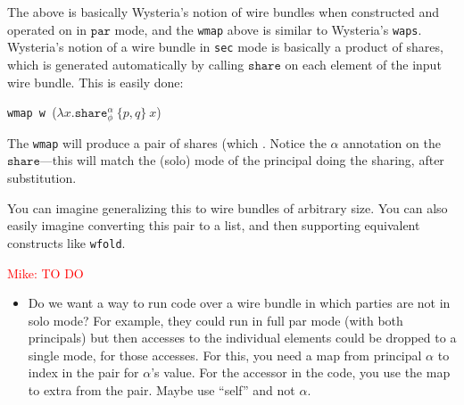 \documentclass[10pt]{article}
\newcommand{\kw}[1]{\ensuremath{\mathtt{#1}}}
\newcommand{\eshare}[4]{\ensuremath{\kw{share}^{#2}_{#1}~{#3}~{#4}}}
\newcommand{\elam}[2]{\ensuremath{\lambda {#1}.{#2}}}
\newcommand{\mwh}[1]{\textcolor{red}{Mike: #1}}
\begin{document}
The above is basically Wysteria's notion of wire bundles when
constructed and operated on in $\kw{par}$ mode, and the \texttt{wmap}
above is similar to Wysteria's \texttt{waps}. Wysteria's notion of a
wire bundle in \texttt{sec} mode is basically a product of
shares, which is generated automatically by calling $\kw{share}$ on
each element of the input wire bundle. This is easily done:

\bigskip
\noindent
\texttt{wmap w }($\elam{x}{\eshare{\phi}{\alpha}{\{p,q\}}{x}}$)
\bigskip

\noindent
The \texttt{wmap} will produce a pair of shares (which . Notice the
$\alpha$ annotation on the $\kw{share}$---this will match the (solo)
mode of the principal doing the sharing, after substitution.

You can imagine generalizing this to wire bundles of arbitrary
size. You can also easily imagine converting this pair to a list, and
then supporting equivalent constructs like \texttt{wfold}.

\mwh{TO DO}
\begin{itemize}
  \item Do we want a way to run code over a wire bundle in which
    parties are not in solo mode? For example, they could run in full
    par mode (with both principals) but then accesses to the
    individual elements could be dropped to a single mode, for those
    accesses. For this, you need a map from principal $\alpha$ to
    index in the pair for $\alpha$'s value. For the accessor in the
    code, you use the map to extra from the pair. Maybe use ``self''
    and not $\alpha$. 
  \end{itemize}
  
\end{document}
